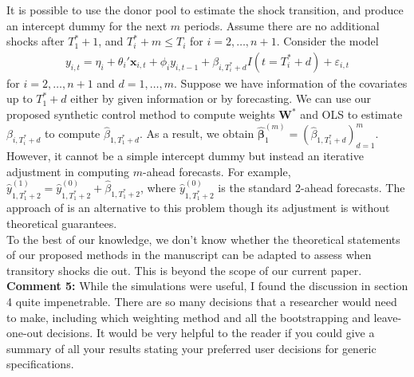 \documentclass[12pt]{article}
\begin{document}
{{It is possible to use the donor pool to estimate the shock transition,  and produce an intercept dummy for the next $m$ periods. Assume there are no additional shocks  after $T_1^*+1$, and $T_i^*+m \leq T_i$ for $i = 2, \ldots, n+1$. Consider the model
\begin{align*}
  y_{i,t} = \eta_i + \theta_i'\mathbf{x}_{i,t} + \phi_i y_{i,t-1 }+\beta_{i, T_i^* + d}I(t = T_i^*+d) +\varepsilon_{i,t}
\end{align*}
for $i = 2, \ldots, n+1$ and $d = 1, \ldots, m$. Suppose we have information of the covariates up to $T_1^*+d$ either by given information or by forecasting. We can use our proposed synthetic control method to compute weights $\mathbf{W}^*$ and OLS to estimate $\beta_{i, T_i^*+d}$ to compute $\hat{\beta}_{1, T_1^*+d}$.  As a result, we obtain $\hat{\boldsymbol{\beta}}_1^{(m)} = (\hat{\beta}_{1, T_1^*+d})_{d = 1}^m$. However, it cannot be a simple intercept dummy but instead an iterative adjustment in computing $m$-ahead forecasts. For example, $\hat{y}_{1, T_1^*+2}^{(1)}=\hat{y}_{1, T_1^*+2}^{(0)}+ \hat{\beta}_{1, T_1^*+2}$, where $\hat{y}_{1, T_1^*+2}^{(0)}$ is the standard 2-ahead forecasts. %
The approach of \cite{agarwal2020two} is an alternative  to this problem though its adjustment is without theoretical guarantees. \\


To the best of our knowledge, we don't know whether the theoretical statements of our proposed methods in the manuscript can be adapted to assess when transitory shocks die out. This is beyond the scope of our current paper.} \\

{\bf Comment 5:} While the simulations were useful, I found the discussion in section 4 quite impenetrable. There are so many decisions that a researcher would need to make, including which weighting method and all the bootstrapping and leave-one-out decisions. It would be very helpful to the reader if you could give a summary of all your results stating your preferred user decisions for generic specifications. \\

}
\end{document}
